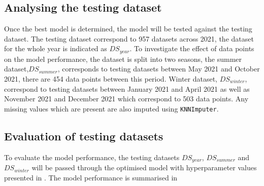\subsection*{Analysing the testing dataset}

Once the best model is determined, the model will be tested against the testing dataset. The testing dataset correspond to 957 datasets across 2021, the dataset for the whole year is indicated as $DS_{year}$. To investigate the effect of data points on the model performance, the dataset is split into two seasons, the summer dataset,$DS_{summer}$, corresponds to testing datasets between May 2021 and October 2021, there are 454 data points between this period. Winter dataset, $DS_{winter}$, correspond to testing datasets between January 2021 and April 2021 as well as November 2021 and December 2021 which correspond to 503 data points. Any missing values which are present are also imputed using {\tt KNNImputer}.\\

\subsection*{Evaluation of testing datasets}

To evaluate the model performance, the testing datasets $DS_{year}$, $DS_{summer}$ and $DS_{winter}$ will be passed through the optimised model with hyperparameter values presented in . The model performance is summarised in    

